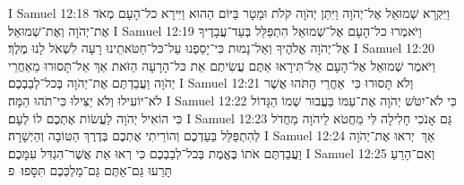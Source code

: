 I Samuel 12:18	וַיִּקְרָא שְׁמוּאֵל אֶל־יְהֹוָה וַיִּתֵּן יְהֹוָה קֹלֹת וּמָטָר בַּיּוֹם הַהוּא וַיִּירָא כל־הָעָם מְאֹד אֶת־יְהֹוָה וְאֶת־שְׁמוּאֵל׃
I Samuel 12:19	וַיֹּאמְרוּ כל־הָעָם אֶל־שְׁמוּאֵל הִתְפַּלֵּל בְּעַד־עֲבָדֶיךָ אֶל־יְהֹוָה אֱלֹהֶיךָ וְאַל־נָמוּת כִּי־יָסַפְנוּ עַל־כּל־חַטֹּאתֵינוּ רָעָה לִשְׁאֹל לָנוּ מֶלֶךְ׃
I Samuel 12:20	וַיֹּאמֶר שְׁמוּאֵל אֶל־הָעָם אַל־תִּירָאוּ אַתֶּם עֲשִׂיתֶם אֵת כּל־הָרָעָה הַזֹּאת אַךְ אַל־תָּסוּרוּ מֵאַחֲרֵי יְהֹוָה וַעֲבַדְתֶּם אֶת־יְהֹוָה בְּכל־לְבַבְכֶם׃
I Samuel 12:21	וְלֹא תָּסוּרוּ כִּי  אַחֲרֵי הַתֹּהוּ אֲשֶׁר לֹא־יוֹעִילוּ וְלֹא יַצִּילוּ כִּי־תֹהוּ הֵמָּה׃
I Samuel 12:22	כִּי לֹא־יִטֹּשׁ יְהֹוָה אֶת־עַמּוֹ בַּעֲבוּר שְׁמוֹ הַגָּדוֹל כִּי הוֹאִיל יְהֹוָה לַעֲשׂוֹת אֶתְכֶם לוֹ לְעָם׃
I Samuel 12:23	גַּם אָנֹכִי חָלִילָה לִּי מֵחֲטֹא לַיהֹוָה מֵחֲדֹל לְהִתְפַּלֵּל בַּעַדְכֶם וְהוֹרֵיתִי אֶתְכֶם בְּדֶרֶךְ הַטּוֹבָה וְהַיְשָׁרָה׃
I Samuel 12:24	אַךְ  יְראוּ אֶת־יְהֹוָה וַעֲבַדְתֶּם אֹתוֹ בֶּאֱמֶת בְּכל־לְבַבְכֶם כִּי רְאוּ אֵת אֲשֶׁר־הִגְדִּל עִמָּכֶם׃
I Samuel 12:25	וְאִם־הָרֵעַ תָּרֵעוּ גַּם־אַתֶּם גַּם־מַלְכְּכֶם תִּסָּפוּ׃ {פ}
